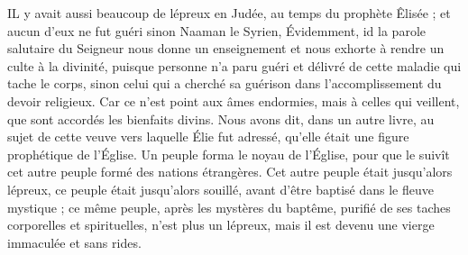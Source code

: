 IL y avait aussi beaucoup de lépreux en Judée, au temps du prophète Êlisée ; et aucun d’eux ne fut guéri sinon Naaman le Syrien, Évidemment, id la parole salutaire du Seigneur nous donne un enseignement et nous exhorte à rendre un culte à la divinité, puisque personne n’a paru guéri et délivré de cette maladie qui tache le corps, sinon celui qui a cherché sa guérison dans l’accomplissement du devoir religieux. Car ce n’est point aux âmes endormies, mais à celles qui veillent, que sont accordés les bienfaits divins. Nous avons dit, dans un autre livre, au sujet de cette veuve vers laquelle Élie fut adressé, qu’elle était une figure prophétique de l’Église. Un peuple forma le noyau de l’Église, pour que le suivît cet autre peuple formé des nations étrangères. Cet autre peuple était jusqu’alors lépreux, ce peuple était jusqu’alors souillé, avant d’être baptisé dans le fleuve mystique ; ce même peuple, après les mystères du baptême, purifié de ses taches corporelles et spirituelles, n’est plus un lépreux, mais il est devenu une vierge immaculée et sans rides.
